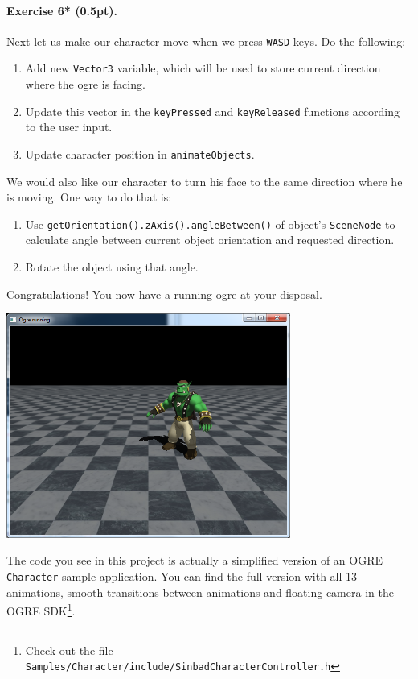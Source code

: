 \documentclass{article}
\newenvironment{exercise}[2]{\paragraph{Exercise #1 (#2pt).} }{
\medskip}
\begin{document}
\begin{exercise}{6*}{0.5}
Next let us make our character move when we press \verb#WASD# keys. Do the following:
\begin{enumerate}[noitemsep]
\item Add new \verb#Vector3# variable, which will be used to store current direction where the ogre is facing.
\item Update this vector in the \verb#keyPressed# and \verb#keyReleased# functions according to the user input.
\item Update character position in \verb#animateObjects#.
\end{enumerate}
We would also like our character to turn his face to the same direction where he is moving. One way to do that is:
\begin{enumerate}[noitemsep]
\item Use \verb#getOrientation().zAxis().angleBetween()# of object's \verb#SceneNode# to calculate angle between current object orientation and requested direction.
\item Rotate the object using that angle.
\end{enumerate}
Congratulations! You now have a running ogre at your disposal.
\end{exercise}

\begin{center}
\includegraphics[width=0.7\textwidth]{meshanim.png}
\end{center}

The code you see in this project is actually a simplified version of an OGRE \texttt{Character} sample application. You can find the full version with all 13 animations, smooth transitions between animations and floating camera in the OGRE SDK\footnote{Check out the file \texttt{Samples/Character/include/SinbadCharacterController.h}}.
\end{document}
